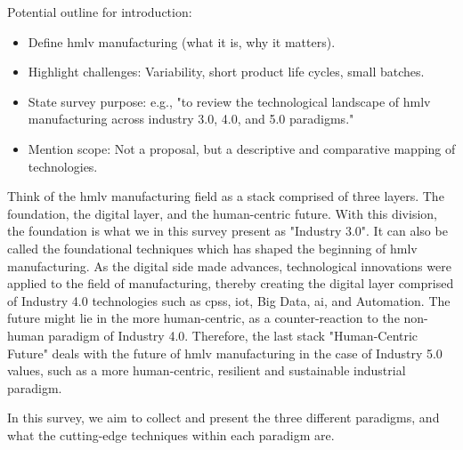 Potential outline for introduction:
\begin{itemize}
    \item Define \ac{hmlv} manufacturing (what it is, why it matters).
    \item Highlight challenges: Variability, short product life cycles, small batches.
    \item State survey purpose: e.g., "to review the technological landscape of \ac{hmlv} manufacturing across industry 3.0, 4.0, and 5.0 paradigms."
    \item Mention scope: Not a proposal, but a descriptive and comparative mapping of technologies.
\end{itemize}

Think of the \ac{hmlv} manufacturing field as a stack comprised of three layers.
The foundation, the digital layer, and the human-centric future. With this division, the foundation is what we in this survey present as "Industry 3.0".
It can also be called the foundational techniques which has shaped the beginning of \ac{hmlv} manufacturing.
As the digital side made advances, technological innovations were applied to the field of manufacturing, thereby creating the digital layer comprised of Industry 4.0 technologies such as \ac{cps}s, \ac{iot}, Big Data, \ac{ai}, and Automation.
The future might lie in the more human-centric, as a counter-reaction to the non-human paradigm of Industry 4.0.
Therefore, the last stack "Human-Centric Future" deals with the future of \ac{hmlv} manufacturing in the case of Industry 5.0 values, such as a more human-centric, resilient and sustainable industrial paradigm.

In this survey, we aim to collect and present the three different paradigms, and what the cutting-edge techniques within each paradigm are.
